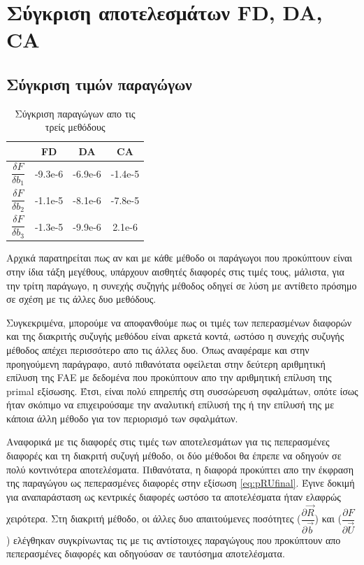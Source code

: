 \section{Σύγκριση αποτελεσμάτων FD, DA, CA} 

\subsection{Σύγκριση τιμών παραγώγων}

\begin{table}[h!]
    \begin{center}
        \begin{tabular}[c]{|c|c|c|c|}
            \hline
            & FD & DA & CA \\
            \hline
            $\dfrac{\delta F}{\delta b_1}$ & -9.3e-6 & -6.9e-6 & -1.4e-5\\[8pt]
            $\dfrac{\delta F}{\delta b_2}$ & -1.1e-5 & -8.1e-6 & -7.8e-5\\[8pt]
            $\dfrac{\delta F}{\delta b_3}$ & -1.3e-5 & -9.9e-6 & 2.1e-6\\[8pt]
            \hline
        \end{tabular}
    \caption{Σύγκριση παραγώγων απο τις τρείς μεθόδους}
    \label{tab:finalComp}
    \end{center}
\end{table}

Αρχικά παρατηρείται πως αν και με κάθε μέθοδο οι παράγωγοι που προκύπτουν είναι στην ίδια τάξη μεγέθους, υπάρχουν αισθητές διαφορές στις τιμές τους, μάλιστα, για την τρίτη παράγωγο, η συνεχής συζηγής μέθοδος οδηγεί σε λύση με αντίθετο πρόσημο σε σχέση με τις άλλες δυο μεθόδους. 

Συγκεκριμένα, μπορούμε να αποφανθούμε πως οι τιμές των πεπερασμένων διαφορών και της διακριτής συζυγής μεθόδου είναι αρκετά κοντά, ωστόσο η συνεχής συζυγής μέθοδος απέχει περισσότερο απο τις άλλες δυο. Όπως αναφέραμε και στην προηγούμενη παράγραφο, αυτό πιθανότατα οφείλεται στην δεύτερη αριθμητική επίλυση της FAE με δεδομένα που προκύπτουν απο την αριθμητική επίλυση της primal εξίσωσης. Έτσι, είναι πολύ επηρεπής στη συσσώρευση σφαλμάτων, οπότε ίσως ήταν σκόπιμο να επιχειρούσαμε την αναλυτική επίλυσή της ή την επίλυσή της με κάποια άλλη μέθοδο για τον περιορισμό των σφαλμάτων. 

Αναφορικά με τις διαφορές στις τιμές των αποτελεσμάτων για τις πεπερασμένες διαφορές και τη διακριτή συζυγή μέθοδο, οι δύο μέθοδοι θα έπρεπε να οδηγούν σε πολύ κοντινότερα αποτελέσματα. Πιθανότατα, η διαφορά προκύπτει απο την έκφραση της παραγώγου ως πεπερασμένες διαφορές στην εξίσωση \ref{eq:pRUfinal}. Έγινε δοκιμή για αναπαράσταση ως κεντρικές διαφορές ωστόσο τα αποτελέσματα ήταν ελαφρώς χειρότερα. Στη διακριτή μέθοδο, οι άλλες δυο απαιτούμενες ποσότητες ($\dfrac{\partial \vec{R}}{\partial \vec{b}}$) και ($\dfrac{\partial F}{\partial \vec{U}}$) ελέγθηκαν συγκρίνωντας τις με τις αντίστοιχες παραγώγους που προκύπτουν απο πεπερασμένες διαφορές και οδηγούσαν σε ταυτόσημα αποτελέσματα. 

